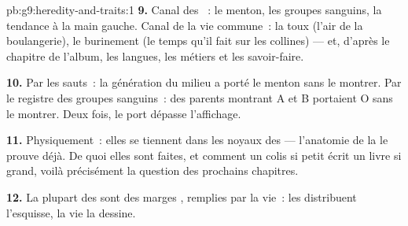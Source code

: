 \begin{solution}{pb:g9:heredity-and-traits:1}
\textbf{9.} Canal des ~: le menton, les groupes
sanguins, la tendance à la main gauche. Canal de la vie
commune~: la toux (l'air de la boulangerie), le
burinement (le temps qu'il fait sur les collines) --- et,
d'après le chapitre de l'album, les langues, les métiers et
les savoir-faire.

\textbf{10.} Par les sauts~: la génération du milieu a
porté le menton sans le montrer. Par le registre des
groupes sanguins~: des parents montrant A et B portaient O
sans le montrer. Deux fois, le port dépasse l'affichage.

\textbf{11.} Physiquement~: elles se tiennent dans les
noyaux des  --- l'anatomie de la  le
prouve déjà. De quoi elles sont faites, et comment un colis
si petit écrit un livre si grand, voilà précisément la
question des prochains chapitres.

\textbf{12.} La plupart des  sont des marges
, remplies par la vie~: les  distribuent
l'esquisse, la vie la dessine.
\end{solution}
